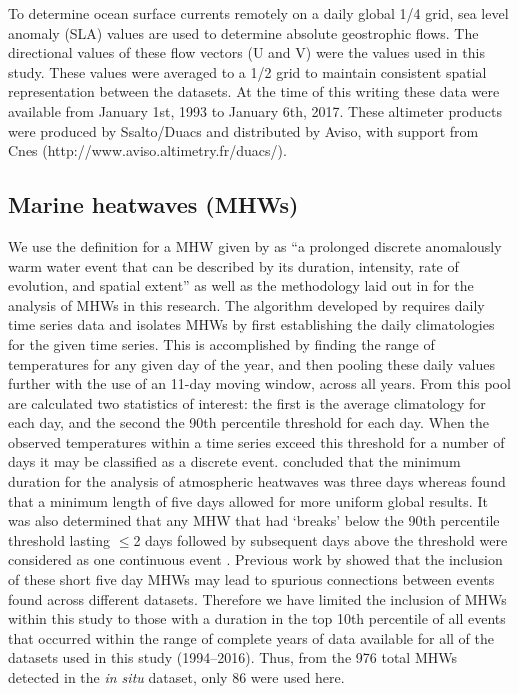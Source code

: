 \documentclass[utf8]{frontiersSCNS}
\begin{document}
To determine ocean surface currents remotely on a daily global 1/4\degree \: grid, sea level anomaly (SLA) values are used to determine absolute geostrophic flows. The directional values of these flow vectors (U and V) were the values used in this study. These values were averaged to a 1/2\degree \: grid to maintain consistent spatial representation between the datasets. At the time of this writing these data were available from January 1st, 1993 to January 6th, 2017. These altimeter products were produced by Ssalto/Duacs and distributed by Aviso, with support from Cnes (http://www.aviso.altimetry.fr/duacs/). 

\subsection{Marine heatwaves (MHWs)}
We use the definition for a MHW given by \citet{Hobday2016} as ``a prolonged discrete anomalously warm water event that can be described by its duration, intensity, rate of evolution, and spatial extent'' as well as the methodology laid out in \citet{Hobday2016} for the analysis of MHWs in this research. The algorithm developed by \citet{Hobday2016} requires daily time series data and isolates MHWs by first establishing the daily climatologies for the given time series. This is accomplished by finding the range of temperatures for any given day of the year, and then pooling these daily values further with the use of an 11-day moving window, across all years. From this pool are calculated two statistics of interest: the first is the average climatology for each day, and the second the 90th percentile threshold for each day. When the observed temperatures within a time series exceed this threshold for a number of days it may be classified as a discrete event. \citet{Perkins2013} concluded that the minimum duration for the analysis of atmospheric heatwaves was three days whereas \citet{Hobday2016} found that a minimum length of five days allowed for more uniform global results. It was also determined that any MHW that had `breaks' below the 90th percentile threshold lasting $\leq$2 days followed by subsequent days above the threshold were considered as one continuous event \citep{Hobday2016}. Previous work by \citet{Schlegel2017} showed that the inclusion of these short five day MHWs may lead to spurious connections between events found across different datasets. Therefore we have limited the inclusion of MHWs within this study to those with a duration in the top 10th percentile of all events that occurred within the range of complete years of data available for all of the datasets used in this study (1994--2016). Thus, from the 976 total MHWs detected in the \emph{in situ} dataset, only 86 were used here.
\end{document}
